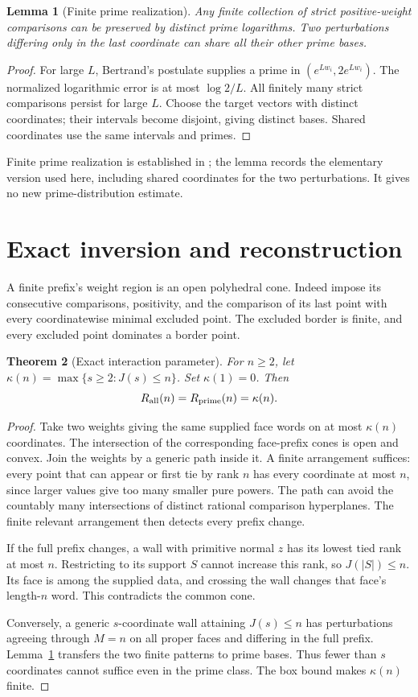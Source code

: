 \documentclass[11pt,a4paper]{article}
\newtheorem{theorem}{Theorem}
\newtheorem{lemma}[theorem]{Lemma}
\theoremstyle{remark}\newtheorem{remark}[theorem]{Remark}
\begin{document}
\begin{lemma}[Finite prime realization]\label{lem:prime}
Any finite collection of strict positive-weight comparisons can
be preserved by distinct prime logarithms. Two perturbations
differing only in the last coordinate can share all their other
prime bases.
\end{lemma}
\begin{proof}
For large \(L\), Bertrand's postulate supplies a prime in
\((e^{Lw_i},2e^{Lw_i})\). The normalized logarithmic error is
at most \(\log2/L\). All finitely many strict comparisons
persist for large \(L\). Choose the target vectors with distinct
coordinates; their intervals become disjoint, giving distinct
bases. Shared coordinates use the same intervals and primes.
\end{proof}
Finite prime realization is established in
\cite[Proposition 6.2]{V02}; the lemma records the elementary
version used here, including shared coordinates for the two
perturbations. It gives no new prime-distribution estimate.

\section{Exact inversion and reconstruction}
A finite prefix's weight region is an open polyhedral cone.
Indeed impose its consecutive comparisons, positivity, and the
comparison of its last point with every coordinatewise minimal
excluded point. The excluded border is finite, and every excluded
point dominates a border point.

\begin{theorem}[Exact interaction parameter]\label{thm:kappa}
For \(n\geq2\), let
\(\kappa(n)=\max\{s\geq2:J(s)\leq n\}\).
Set \(\kappa(1)=0\).
Then
\[
 R_{\rm all}(n)=R_{\rm prime}(n)=\kappa(n).
\]
\end{theorem}
\begin{proof}
Take two weights giving the same supplied face words on at most
\(\kappa(n)\) coordinates. The intersection of the corresponding
face-prefix cones is open and convex. Join the weights by a
generic path inside it. A finite arrangement suffices: every point
that can appear or first tie by rank \(n\) has every coordinate
at most \(n\), since larger values give too many smaller pure powers.
The path can avoid the countably many intersections of distinct
rational comparison hyperplanes. The finite relevant arrangement
then detects every prefix change.

If the full prefix changes, a wall with primitive normal \(z\)
has its lowest tied rank at most \(n\). Restricting to its support
\(S\) cannot increase this rank, so \(J(|S|)\leq n\).
Its face is among the supplied data, and crossing the wall changes
that face's length-\(n\) word. This contradicts the common cone.

Conversely, a generic \(s\)-coordinate wall attaining \(J(s)\leq n\)
has perturbations agreeing through \(M=n\) on all proper faces and
differing in the full prefix. Lemma~\ref{lem:prime} transfers the
two finite patterns to prime bases. Thus fewer than \(s\) coordinates
cannot suffice even in the prime class. The box bound makes
\(\kappa(n)\) finite.
\end{proof}
\end{document}
